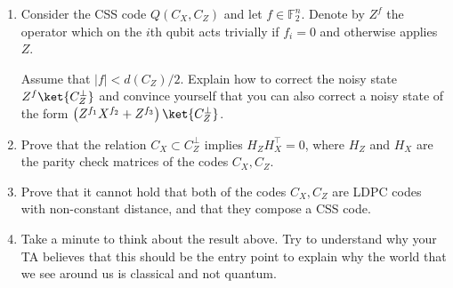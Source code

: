 \documentclass[12pt,a4paper]{article}
\begin{document}
\begin{enumerate}

  \item Consider the CSS code $Q(C_{X}, C_{Z})$ and let $f \in \mathbb{F}_{2}^{n}$. Denote by $Z^{f}$ the operator which on the $i$th qubit acts trivially if $f_{i} = 0$ and otherwise applies $Z$. 

    Assume that $|f| < d(C_{Z})/2$. Explain how to correct the noisy state $Z^{f}\ket{C_{Z}^\perp}$ and convince yourself that you can also correct a noisy state of the form $\left( Z^{f_{1}}X^{f_{2}} + Z^{f_{3}} \right) \ket{C_{Z}^\perp}$.

\inb{ We will apply the Hadamard gate $H^{\otimes n}$, apply the classical decoder for $C_{Z}$, and eventually we will apply the Hadamard again to return to the original form. The state is evolving as follows:
    } 



  \item  Prove that the relation $C_{X} \subset C_{Z}^{\perp}$ implies $H_{Z}H_{X}^\top = 0$, where $H_{Z}$ and $H_{X}$ are the parity check matrices of the codes $C_{X}, C_{Z}$.

  \item Prove that it cannot hold that both of the codes $C_{X}, C_{Z}$ are LDPC codes with non-constant distance, and that they compose a CSS code.



  \item Take a minute to think about the result above. Try to understand why your TA believes that this should be the entry point to explain why the world that we see around us is classical and not quantum.



\end{enumerate}
\end{document}
